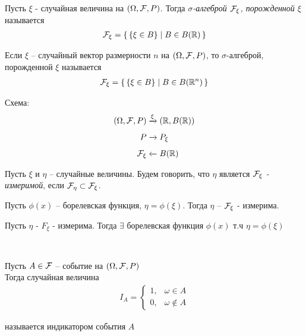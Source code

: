 
\begin{definition}
  Пусть $\xi$ - случайная величина на $(\Omega, \mathcal{F}, P)$. 
  Тогда \emph{$\sigma$-алгеброй $\mathcal{F}_\xi$, порожденной $\xi$} называется
  \begin{align*}
    \mathcal{F}_\xi = \left\{ \, \{ \xi \in B \} \mid B \in B(\mathbb{R}) \, \right\}
  \end{align*}
\end{definition}

\begin{definition}
  Если $\xi$ -- случайный вектор размерности $n$ на $(\Omega, \mathcal{F}, P)$, 
  то $\sigma$-алгеброй, порожденной $\xi$ называется
  \begin{align*}
    \mathcal{F}_\xi = \left\{ \, \{ \xi \in B \} \mid B \in B(\mathbb{R}^n) \, \right\}
  \end{align*}
\end{definition}

Схема:
\begin{align*}
  (\Omega, \mathcal{F}, P) &\xrightarrow{\xi} (\mathbb{R}, B(\mathbb{R}))\\
  P                  &\xrightarrow{\phantom{\xi}} P_\xi\\
  \mathcal{F}_\xi              &\xleftarrow{\phantom{\xi}} B(\mathbb{R})
\end{align*}

\begin{definition}
  Пусть $\xi$ и $\eta$ -- случайные величины. 
  Будем говорить, что $\eta$ является \emph{$\mathcal{F}_\xi$ - измеримой}, 
  если $\mathcal{F}_\eta \subset \mathcal{F}_\xi$.
\end{definition}

\begin{exercise}
  Пусть $\phi(x)$ -- борелевская функция, $\eta = \phi(\xi)$. Тогда $\eta$ -- $\mathcal{F}_\xi$ - измерима.
\end{exercise}

\begin{theorem}
  Пусть $\eta$ - $F_\xi$ - измерима. 
  Тогда $\exists$ борелевская функция $\phi(x)$ т.ч\; $\eta = \phi(\xi)$
\end{theorem}

\begin{definition}~

  Пусть $A \in \mathcal{F}$ -- событие на $(\Omega, \mathcal{F}, P)$\\
  Тогда случайная величина\\
  \begin{align*}
    I_A = \begin{cases}
              1, & \omega \in A\\
              0, & \omega \not\in A
          \end{cases}
  \end{align*}

  называется индикатором события $A$
\end{definition}

